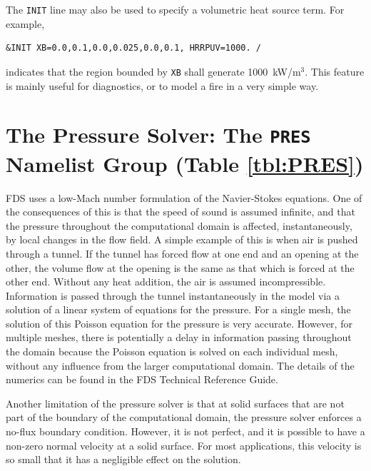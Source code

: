 \documentclass[11pt]{book}
\newcommand{\ct}{\tt\small}
\begin{document}
The {\ct INIT} line may also be used to specify a volumetric heat source term. For example,

\footnotesize
\begin{verbatim}
&INIT XB=0.0,0.1,0.0,0.025,0.0,0.1, HRRPUV=1000. /
\end{verbatim}

\normalsize
\noindent indicates that the region bounded by {\ct XB} shall generate 1000~kW/m$^3$. This feature is mainly useful for diagnostics, or to model a fire in a very simple way.





\clearpage

\section{The Pressure Solver: The \texorpdfstring{{\tt PRES}}{PRES} Namelist Group (Table \ref{tbl:PRES})}
\label{info:PRES}

FDS uses a low-Mach number formulation of the Navier-Stokes equations. One of the consequences of this is that the speed of sound is
assumed infinite, and that the pressure throughout the computational domain is affected, instantaneously, by local changes in the flow field. A simple example of
this is when air is pushed through a tunnel. If the tunnel has forced flow at one end and an opening at the other, the volume flow at the opening is the same
as that which is forced at the other end. Without any heat addition, the air is assumed incompressible. Information is passed through the tunnel
instantaneously in the model via a solution of a linear system of equations for the pressure. For a single mesh, the solution of this Poisson equation for
the pressure is very accurate. However, for multiple meshes, there is potentially a delay in information passing throughout the domain because the Poisson
equation is solved on each individual mesh, without any influence from the larger computational domain. The details of the numerics can be found in the
FDS Technical Reference Guide.


Another limitation of the pressure solver is that at solid surfaces that are not part of the boundary of the computational domain,
the pressure solver enforces a no-flux boundary condition. However, it is not perfect, and
it is possible to have a non-zero normal velocity at a solid surface. For most applications, this velocity is so small that it has a negligible effect on the solution.
\end{document}
